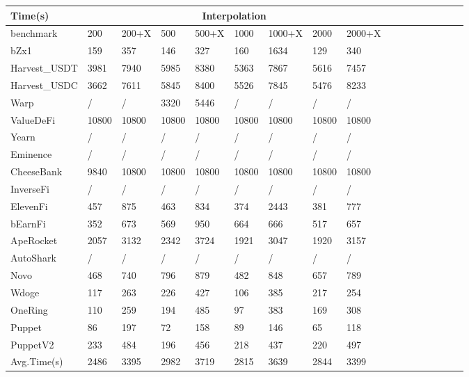 \begin{table}[thbp]
    \begin{tabular}{|l|llllllll|llllllll|}
    \hline
    Time(s)       & \multicolumn{8}{c|}{Interpolation}                              \\ \hline
    benchmark     & 200   & 200+X & 500   & 500+X & 1000  & 1000+X & 2000  & 2000+X \\  \hline
    bZx1          & 159   & 357   & 146   & 327   & 160   & 1634   & 129   & 340    \\
    Harvest\_USDT & 3981  & 7940  & 5985  & 8380  & 5363  & 7867   & 5616  & 7457   \\
    Harvest\_USDC & 3662  & 7611  & 5845  & 8400  & 5526  & 7845   & 5476  & 8233   \\
    Warp          & /     & /     & 3320  & 5446  & /     & /      & /     & /      \\
    ValueDeFi     & 10800 & 10800 & 10800 & 10800 & 10800 & 10800  & 10800 & 10800  \\
    Yearn         & /     & /     & /     & /     & /     & /      & /     & /      \\
    Eminence      & /     & /     & /     & /     & /     & /      & /     & /      \\
    CheeseBank    & 9840  & 10800 & 10800 & 10800 & 10800 & 10800  & 10800 & 10800  \\
    InverseFi     & /     & /     & /     & /     & /     & /      & /     & /      \\
    ElevenFi      & 457   & 875   & 463   & 834   & 374   & 2443   & 381   & 777    \\
    bEarnFi       & 352   & 673   & 569   & 950   & 664   & 666    & 517   & 657    \\
    ApeRocket     & 2057  & 3132  & 2342  & 3724  & 1921  & 3047   & 1920  & 3157   \\
    AutoShark     & /     & /     & /     & /     & /     & /      & /     & /      \\
    Novo          & 468   & 740   & 796   & 879   & 482   & 848    & 657   & 789    \\
    Wdoge         & 117   & 263   & 226   & 427   & 106   & 385    & 217   & 254    \\
    OneRing       & 110   & 259   & 194   & 485   & 97    & 383    & 169   & 308    \\
    Puppet        & 86    & 197   & 72    & 158   & 89    & 146    & 65    & 118    \\
    PuppetV2      & 233   & 484   & 196   & 456   & 218   & 437    & 220   & 497    \\ \hline
    Avg.Time(s)   & 2486  & 3395  & 2982  & 3719  & 2815  & 3639   & 2844  & 3399   \\ \hline
    \end{tabular}


\label{tab:SupTime}
\end{table}

